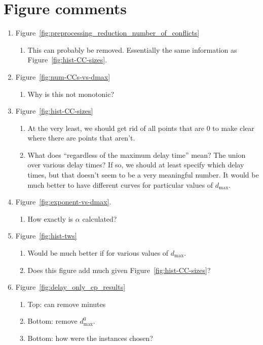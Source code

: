 \section{Figure comments}

\begin{enumerate}
\item
  Figure~\ref{fig:preprocessing_reduction_number_of_conflicts}
  \begin{enumerate}
    \item This can probably be removed. Essentially the same information as Figure~\ref{fig:hist-CC-sizes}.
    \end{enumerate}
\item 
Figure~\ref{fig:num-CCs-vs-dmax}
\begin{enumerate}
  \item
    Why is this not monotonic?
\end{enumerate}
\item 
Figure~\ref{fig:hist-CC-sizes}
\begin{enumerate}
\item
At the very least, we should get rid of all points that are 0 to make clear where there are points that aren't.
\item
  What does ``regardless of the maximum delay time'' mean? The union over various delay times? If so, we should at least specify which delay times, but that doesn't seem to be a very meaningful number. 
  It would be much better to have different curves for particular values of $d_{\max}$.
\end{enumerate}

\item
Figure~\ref{fig:exponent-vs-dmax}.
\begin{enumerate}
\item How exactly is $\alpha$ calculated?
\end{enumerate}

\item
Figure~\ref{fig:hist-tws}
\begin{enumerate}
  \item Would be much better if for various values of $d_{\max}$.
  \item Does this figure add much given Figure~\ref{fig:hist-CC-sizes}?
\end{enumerate}

\item
Figure~\ref{fig:delay_only_cp_results}
\begin{enumerate}
\item Top: can remove minutes
\item Bottom: remove $d^0_{\max}$.
\item Bottom: how were the instances chosen?
\end{enumerate}
\end{enumerate}
